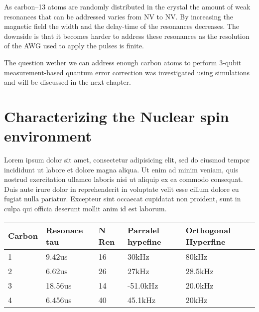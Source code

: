 As carbon--13 atoms are randomly distributed in the crystal the amount of weak resonances that can be addressed varies from NV to NV. By increasing the magnetic field the width and the delay-time of the resonances decreases. The downside is that it becomes harder to address these resonances as the resolution of the AWG used to apply the pulses is finite.

The question wether we can address enough carbon atoms to perform 3-qubit measurement-based quantum error correction was investigated using simulations and will be discussed in the next chapter.

\section{Characterizing the Nuclear spin environment}
Lorem ipsum dolor sit amet, consectetur adipisicing elit, sed do eiusmod
tempor incididunt ut labore et dolore magna aliqua. Ut enim ad minim veniam,
quis nostrud exercitation ullamco laboris nisi ut aliquip ex ea commodo
consequat. Duis aute irure dolor in reprehenderit in voluptate velit esse
cillum dolore eu fugiat nulla pariatur. Excepteur sint occaecat cupidatat non
proident, sunt in culpa qui officia deserunt mollit anim id est laborum.




\begin{table}
    \begin{tabular}{lllll}
    Carbon & Resonace tau & N Ren & Parralel hypefine & Orthogonal Hyperfine \\ \hline
    1      & 9.42us      & 16    & 30kHz             & 80kHz                \\
    2      & 6.62us       & 26    & 27kHz             & 28.5kHz              \\
    3      & 18.56us      & 14    & -51.0kHz          & 20.0kHz              \\
    4      & 6.456us      & 40    & 45.1kHz           & 20kHz                \\
    \end{tabular}
\end{table}



